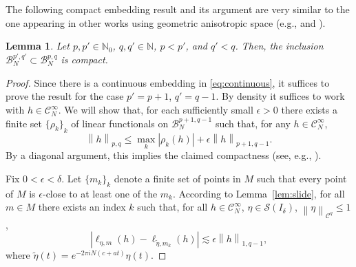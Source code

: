 \documentclass[a4paper,11pt]{amsart}
\newtheorem{lemma}[theorem]{Lemma}
\theoremstyle{remark}
\newcommand{\abs}[1]{\left|#1\right|} %
\newcommand{\cB}{\mathcal{B}} %
\newcommand{\cC}{\mathcal{C}} %
\newcommand{\cS}{\mathcal{S}} %
\newcommand{\bN}{\mathbb{N}} %
\newcommand{\norm}[1]{\left\|#1\right\|} %
\begin{document}
The following compact embedding result and its argument are very similar to the one appearing in other works using geometric anisotropic space (e.g., \cite[\S5]{GL06} and \cite[\S2.2]{FGL19}).

\begin{lemma}
    \label{lem:compact-embed}
    Let \(p,p'\in \bN_0\), \(q,q'\in\bN\), \(p < p'\), and \(q' < q\).
    Then, the inclusion \(\cB_{N}^{p',q'} \subset \cB_{N}^{p,q}\) is compact.
\end{lemma}

\begin{proof}
    Since there is a continuous embedding in \eqref{eq:continuous}, it suffices to prove the result for the case \(p' = p+1\), \(q'=q-1\).
    By density it suffices to work with \(h\in \cC^{\infty}_{N}\).
    We will show that, for each sufficiently small \(\epsilon>0\) there exists a finite set \({\{\rho_k\}}_{k}\) of linear functionals on \(\cB_{N}^{p+1,q-1}\) such that, for any \(h\in \cC^{\infty}_{N}\),
    \begin{equation}
        \label{eq:compact-bound}
        \norm{h}_{p,q} \leq \max_{k}\abs{\rho_k(h)} + \epsilon \norm{h}_{p+1,q-1}.
    \end{equation}
    By a diagonal argument, this implies the claimed compactness (see, e.g., \cite[Proof of Prop.\,2.8]{FGL19}).

    Fix \(0<\epsilon < \delta\).
    Let \({\{m_k\}}_{k}\) denote a finite set of points in \(M\) such that every point of \(M\) is \(\epsilon\)-close to at least one of the \(m_k\).
    According to Lemma~\ref{lem:slide}, for all \(m \in M\) there exists an index \(k\) such that, for all \(h\in \cC^\infty_N\), \(\eta \in \cS(I_\delta)\), \(\norm{\eta}_{\cC^q} \leq 1\),
    \begin{equation}
        \label{eq:compact1}
        \abs{\ell_{\eta,m}(h) - \ell_{\tilde{\eta},m_k}(h)} \lesssim \epsilon \norm{h}_{1,q-1},
    \end{equation}
    where \(\tilde{\eta}(t) = e^{- 2\pi i N (c + at)} \eta(t)\).


\end{proof}
\end{document}
